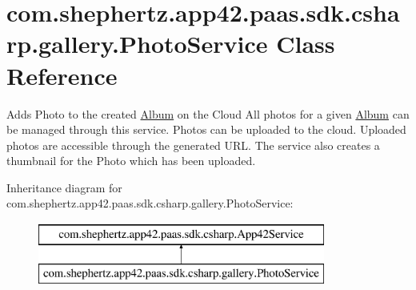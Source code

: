 \hypertarget{classcom_1_1shephertz_1_1app42_1_1paas_1_1sdk_1_1csharp_1_1gallery_1_1_photo_service}{\section{com.\+shephertz.\+app42.\+paas.\+sdk.\+csharp.\+gallery.\+Photo\+Service Class Reference}
\label{classcom_1_1shephertz_1_1app42_1_1paas_1_1sdk_1_1csharp_1_1gallery_1_1_photo_service}
}


Adds Photo to the created \hyperlink{classcom_1_1shephertz_1_1app42_1_1paas_1_1sdk_1_1csharp_1_1gallery_1_1_album}{Album} on the Cloud All photos for a given \hyperlink{classcom_1_1shephertz_1_1app42_1_1paas_1_1sdk_1_1csharp_1_1gallery_1_1_album}{Album} can be managed through this service. Photos can be uploaded to the cloud. Uploaded photos are accessible through the generated U\+R\+L. The service also creates a thumbnail for the Photo which has been uploaded.  


Inheritance diagram for com.\+shephertz.\+app42.\+paas.\+sdk.\+csharp.\+gallery.\+Photo\+Service\+:\begin{figure}[H]
\begin{center}
\leavevmode
\includegraphics[height=2.000000cm]{classcom_1_1shephertz_1_1app42_1_1paas_1_1sdk_1_1csharp_1_1gallery_1_1_photo_service}
\end{center}
\end{figure}
